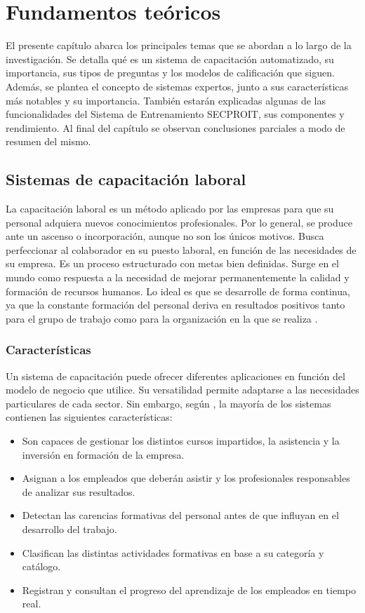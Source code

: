 \chapter{Fundamentos teóricos}
El presente capítulo abarca los principales temas que se abordan a lo largo de la investigación. Se detalla qué es un sistema de capacitación automatizado, su importancia, sus tipos de preguntas y los modelos de calificación que siguen. Además, se plantea el concepto de sistemas expertos, junto a sus características más notables y su importancia. También estarán explicadas algunas de las funcionalidades del Sistema de Entrenamiento SECPROIT, sus componentes y rendimiento.
Al final del capítulo se observan conclusiones parciales a modo de resumen del mismo.

\section{Sistemas de capacitación laboral}
La capacitación laboral es un método aplicado por las empresas para que su personal adquiera nuevos conocimientos profesionales. Por lo general, se produce ante un ascenso o incorporación, aunque no son los únicos motivos. Busca perfeccionar al colaborador en su puesto laboral, en función de las necesidades de su empresa. Es un proceso estructurado con metas bien definidas. Surge en el mundo como respuesta a la necesidad de mejorar permanentemente la calidad y formación de recursos humanos. Lo ideal es que se desarrolle de forma continua, ya que la constante formación del personal deriva en resultados positivos tanto para el grupo de trabajo como para la organización en la que se realiza \cite{Denby2010}.

\subsection{Características}
Un sistema de capacitación puede ofrecer diferentes aplicaciones en función del modelo de negocio que utilice. Su versatilidad permite adaptarse a las necesidades particulares de cada sector. Sin embargo, según \cite{GarciaPaez2022}, la mayoría de los sistemas contienen las siguientes características:

\begin{itemize}
\item Son capaces de gestionar los distintos cursos impartidos, la asistencia y la inversión en formación de la empresa.
\item Asignan a los empleados que deberán asistir y los profesionales responsables de analizar sus resultados.
\item Detectan las carencias formativas del personal antes de que influyan en el desarrollo del trabajo.
\item Clasifican las distintas actividades formativas en base a su categoría y catálogo.
\item Registran y consultan el progreso del aprendizaje de los empleados en tiempo real.
\end{itemize}

